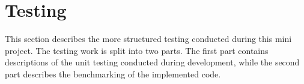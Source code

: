 \chapter{Testing} 
This section describes the more structured testing conducted during this mini project. The testing work is split into two parts. The first part contains descriptions of the unit testing conducted during development, while the second part describes the benchmarking of the implemented code. 